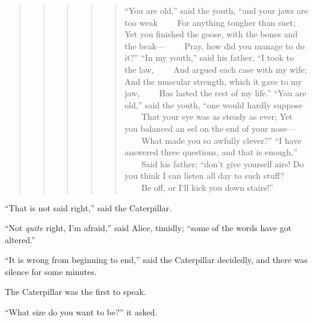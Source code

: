 \documentclass[11pt,openany,oneside]{book}
\begin{document}
\begin{quote}
\begin{quote}
\begin{quote}
\begin{quote}
\begin{quote}
{\small  “You are old,” said the youth, “and your jaws are too weak}\newline
{\small  ~~~~For anything tougher than suet;}\newline
{\small  Yet you finished the goose, with the bones and the beak—}\newline
{\small  ~~~~Pray, how did you manage to do it?”}\newline
{\small  }\newline
{\small  “In my youth,” said his father, “I took to the law,}\newline
{\small  ~~~~And argued each case with my wife;}\newline
{\small  And the muscular strength, which it gave to my jaw,}\newline
{\small  ~~~~Has lasted the rest of my life.”}\newline
{\small  }\newline
{\small  “You are old,” said the youth, “one would hardly suppose}\newline
{\small  ~~~~That your eye was as steady as ever;}\newline
{\small  Yet you balanced an eel on the end of your nose—}\newline
{\small  ~~~~What made you so awfully clever?”}\newline
{\small  }\newline
{\small  “I have answered three questions, and that is enough,”}\newline
{\small  ~~~~Said his father; “don’t give yourself airs!}\newline
{\small  Do you think I can listen all day to such stuff?}\newline
{\small  ~~~~Be off, or I’ll kick you down stairs!” }

\end{quote}
\end{quote}
\end{quote}
\end{quote}
\end{quote}
“That is not said right,” said the Caterpillar. 

“Not {\em quite\/} right, I’m afraid,” said Alice, timidly; “some of the words have got altered.” 

“It is wrong from beginning to end,” said the Caterpillar decidedly, and there was silence for some minutes. 

The Caterpillar was the first to speak. 

“What size do you want to be?” it asked. 
\end{document}
